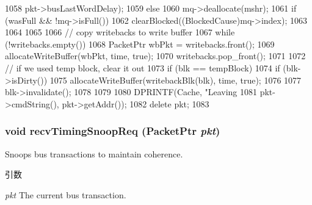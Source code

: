 \begin{DoxyCode}
{{1058                           pkt->busLastWordDelay);
1059     } else {
1060         mq->deallocate(mshr);
1061         if (wasFull && !mq->isFull()) {
1062             clearBlocked((BlockedCause)mq->index);
1063         }
1064     }
1065 
1066     // copy writebacks to write buffer
1067     while (!writebacks.empty()) {
1068         PacketPtr wbPkt = writebacks.front();
1069         allocateWriteBuffer(wbPkt, time, true);
1070         writebacks.pop_front();
1071     }
1072     // if we used temp block, clear it out
1073     if (blk == tempBlock) {
1074         if (blk->isDirty()) {
1075             allocateWriteBuffer(writebackBlk(blk), time, true);
1076         }
1077         blk->invalidate();
1078     }
1079 
1080     DPRINTF(Cache, "Leaving %
1081             pkt->cmdString(), pkt->getAddr());
1082     delete pkt;
1083 }
\end{DoxyCode}
\hypertarget{classCache_aff3031c56fc4947a19695c868bb8233e}{
\subsubsection[{recvTimingSnoopReq}]{\setlength{\rightskip}{0pt plus 5cm}void recvTimingSnoopReq ({\bf PacketPtr} {\em pkt})}}
\label{classCache_aff3031c56fc4947a19695c868bb8233e}
Snoops bus transactions to maintain coherence. 
\begin{DoxyParams}{引数}
\item[{\em pkt}]The current bus transaction. \end{DoxyParams}



